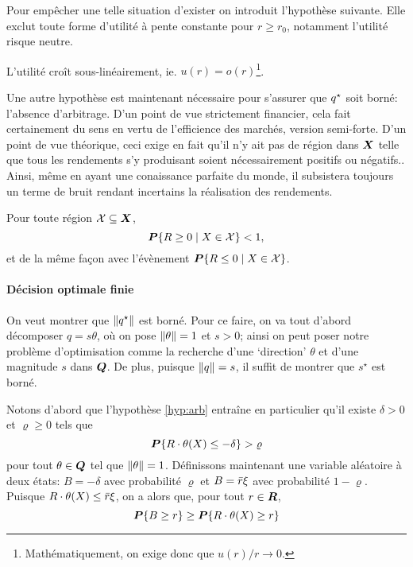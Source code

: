 Pour empêcher une telle situation d'exister on introduit l'hypothèse suivante. Elle exclut
toute forme d'utilité à pente constante pour $r \geq r_0$, notamment l'utilité risque neutre.
\begin{assumption}
  L'utilité croît sous-linéairement, ie. $u(r) = o(r)$\footnote{Mathématiquement, on exige
    donc que $u(r)/r \to 0$.}. 
\end{assumption}

Une autre hypothèse est maintenant nécessaire pour s'assurer que $q^\star$ soit borné:
l'absence d'arbitrage. D'un point de vue strictement financier, cela fait certainement du
sens en vertu de l'efficience des marchés, version semi-forte\cit. D'un point de vue
théorique, ceci exige en fait qu'il n'y ait pas de région dans $\bm{X}$ telle que tous les
rendements s'y produisant soient nécessairement positifs ou négatifs.. Ainsi, même en ayant une conaissance parfaite du monde, il subsistera toujours
un terme de bruit rendant incertains la réalisation des rendements.

\begin{assumption}
  \label{hyp:arb}
  Pour toute région $\mathcal{X}\subseteq\bm{X}$,
  \begin{equation}
    \bm P\{R \geq 0 \mid X \in \mathcal{X}\} < 1,
  \end{equation}
  et de la même façon avec l'évènement $\bm P\{R \leq 0 \mid X \in \mathcal{X}\}$. 
\end{assumption}


\paragraph{Décision optimale finie}

  On veut montrer que $\|q^\star\|$ est borné. Pour ce faire, on va tout d'abord décomposer
  $q = s\theta$, où on pose $\|\theta\|=1$ et $s>0$; ainsi on peut poser notre problème
  d'optimisation comme la recherche d'une `direction' $\theta$ et d'une magnitude $s$ dans
  $\bm Q$. De plus, puisque $\|q\| = s$, il suffit de montrer que $s^\star$ est borné.

  Notons d'abord que l'hypothèse \ref{hyp:arb} entraîne en particulier qu'il existe
  $\delta > 0$ et $\varrho \geq 0$ tels que
  \begin{equation}
    \bm P\{R\cdot \theta(X) \leq -\delta\} > \varrho
  \end{equation}
  pour tout $\theta \in \bm Q$ tel que $\|\theta\| = 1$. Définissons maintenant une variable aléatoire à
  deux états: $B = -\delta$ avec probabilité $\varrho$ et $B = \bar r\xi$ avec probabilité
  $1-\varrho$. Puisque $R\cdot \theta(X) \leq \bar r\xi$, on a alors que, pour tout $r \in \bm{R}$,
  \begin{equation}
    \bm P\{B\geq r\} \geq \bm P\{R\cdot \theta(X)\geq r\}
  \end{equation}


